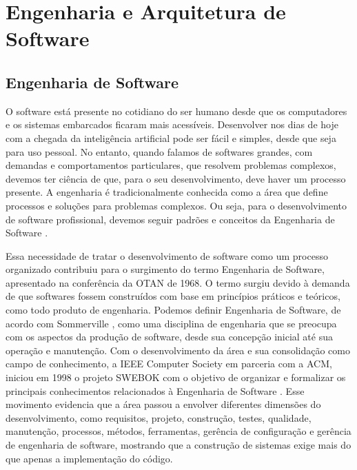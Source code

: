 \chapter{Engenharia e Arquitetura de Software}
\label{chap3}

\section{Engenharia de Software}

O software está presente no cotidiano do ser humano desde que os computadores e os sistemas embarcados ficaram mais acessíveis. Desenvolver nos dias de hoje com a chegada da inteligência artificial pode ser fácil e simples, desde que seja para uso pessoal. No entanto, quando falamos de softwares grandes, com demandas e comportamentos particulares, que resolvem problemas complexos, devemos ter ciência de que, para o seu desenvolvimento, deve haver um processo presente. A engenharia é tradicionalmente conhecida como a área que define processos e soluções para problemas complexos. Ou seja, para o desenvolvimento de software profissional, devemos seguir padrões e conceitos da Engenharia de Software \cite{sommerville2016,swebok2024}.

Essa necessidade de tratar o desenvolvimento de software como um processo organizado contribuiu para o surgimento do termo Engenharia de Software, apresentado na conferência da OTAN de 1968. O termo surgiu devido à demanda de que softwares fossem construídos com base em princípios práticos e teóricos, como todo produto de engenharia. Podemos definir Engenharia de Software, de acordo com Sommerville \cite[p.~19]{sommerville2016}, como uma disciplina de engenharia que se preocupa com os aspectos da produção de software, desde sua concepção inicial até sua operação e manutenção. Com o desenvolvimento da área e sua consolidação como campo de conhecimento, a IEEE Computer Society em parceria com a ACM, iniciou em 1998 o projeto SWEBOK com o objetivo de organizar e formalizar os principais conhecimentos relacionados à Engenharia de Software \cite{swebok2024,se2014}. Esse movimento evidencia que a área passou a envolver diferentes dimensões do desenvolvimento, como requisitos, projeto, construção, testes, qualidade, manutenção, processos, métodos, ferramentas, gerência de configuração e gerência de engenharia de software, mostrando que a construção de sistemas exige mais do que apenas a implementação do código.

